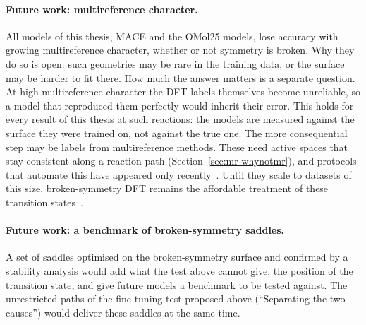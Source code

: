 \paragraph{Future work: multireference character.} All models of this
thesis, MACE and the OMol25 models, lose accuracy with growing
multireference character, whether or not symmetry is broken. Why they do
so is open: such geometries may be rare in the training data, or the
surface may be harder to fit there. How much the answer matters is a
separate question. At high multireference character the DFT labels
themselves become unreliable, so a model that reproduced them perfectly
would inherit their error. This holds for every result of this thesis at
such reactions: the models are measured against the surface they were
trained on, not against the true one. The more consequential step may be
labels from multireference methods. These need active spaces that stay
consistent along a reaction path (Section~\ref{sec:mr-whynotmr}), and
protocols that automate this have appeared only
recently~\cite{bensberg2023, seal2025wasp}. Until they scale to datasets
of this size, broken-symmetry DFT remains the affordable treatment of
these transition states~\cite{grafenstein2002, crawford2001}.

\paragraph{Future work: a benchmark of broken-symmetry saddles.} A set
of saddles optimised on the broken-symmetry surface and confirmed by a
stability analysis would add what the test above cannot give, the
position of the transition state, and give future models a benchmark to
be tested against. The unrestricted paths of the fine-tuning test
proposed above (``Separating the two causes'') would deliver these
saddles at the same time.
